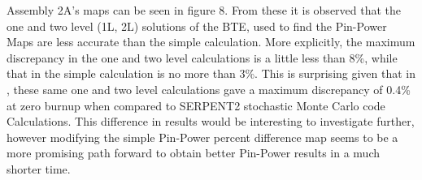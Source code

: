 \documentclass[12pt]{article}
\begin{document}
Assembly 2A's maps can be seen in figure 8. From these it is observed that the one and two level (1L, 2L) solutions of the BTE, used to find the Pin-Power Maps are less accurate than the simple calculation. More explicitly, the maximum discrepancy in the one and two level calculations is a little less than 8\%, while that in the simple calculation is no more than 3\%. This is surprising given that in \cite{ghasabyan2020validation}, these same one and two level calculations gave a maximum discrepancy of 0.4\% at zero burnup when compared to SERPENT2 stochastic Monte Carlo code Calculations. This difference in results would be interesting to investigate further, however modifying the simple Pin-Power percent difference map seems to be a more promising path forward to obtain better Pin-Power results in a much shorter time.
\end{document}
